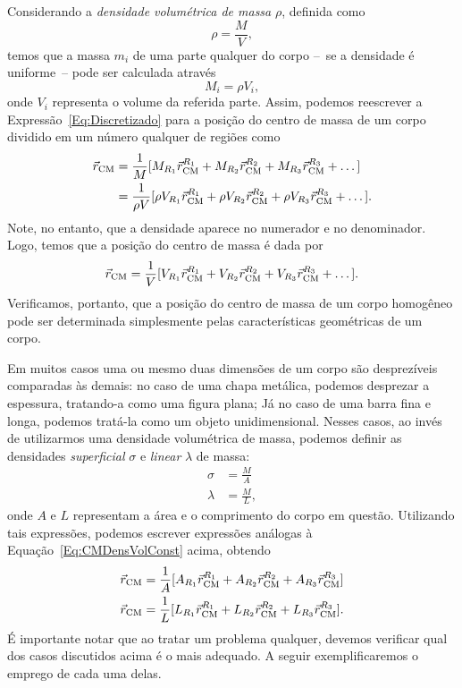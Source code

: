 Considerando a \emph{densidade volumétrica de massa} $\rho$, definida como
\begin{equation}
    \rho = \frac{M}{V},
\end{equation}
%
temos que a massa $m_i$ de uma parte qualquer do corpo --~se a densidade é uniforme~-- pode ser calculada através
\begin{equation}
    M_i = \rho V_i,
\end{equation}
%
onde $V_i$ representa o volume da referida parte. Assim, podemos reescrever a Expressão~\eqref{Eq:Discretizado} para a posição do centro de massa de um corpo dividido em um número qualquer de regiões como
\begin{align}
    \vec{r}_{\rm{CM}} &= \frac{1}{M} [M_{R_1} \vec{r}_{\rm{CM}}^{R_1} + M_{R_2} \vec{r}_{\rm{CM}}^{R_2} + M_{R_3} \vec{r}_{\rm{CM}}^{R_3} + \dots] \\
    &= \frac{1}{\rho V} [\rho V_{R_1} \vec{r}_{\rm{CM}}^{R_1} + \rho V_{R_2} \vec{r}_{\rm{CM}}^{R_2} + \rho V_{R_3} \vec{r}_{\rm{CM}}^{R_3} + \dots].
\end{align}
%
Note, no entanto, que a densidade aparece no numerador e no denominador. Logo, temos que a posição do centro de massa é dada por
\begin{equation}\label{Eq:CMDensVolConst}
    \vec{r}_{\rm{CM}} = \frac{1}{V} [V_{R_1} \vec{r}_{\rm{CM}}^{R_1} + V_{R_2} \vec{r}_{\rm{CM}}^{R_2} + V_{R_3} \vec{r}_{\rm{CM}}^{R_3} + \dots].
\end{equation}
%
Verificamos, portanto, que a posição do centro de massa de um corpo homogêneo pode ser determinada simplesmente pelas características geométricas de um corpo.

Em muitos casos uma ou mesmo duas dimensões de um corpo são desprezíveis comparadas às demais: no caso de uma chapa metálica, podemos desprezar a espessura, tratando-a como uma figura plana; Já no caso de uma barra fina e longa, podemos tratá-la como um objeto unidimensional. Nesses casos, ao invés de utilizarmos uma densidade volumétrica de massa, podemos definir as densidades \emph{superficial} $\sigma$ e \emph{linear} $\lambda$ de massa:
\begin{align}
    \sigma &= \frac{M}{A} \\
    \lambda &= \frac{M}{L},
\end{align}
%
onde $A$ e $L$ representam a área e o comprimento do corpo em questão. Utilizando tais expressões, podemos escrever expressões análogas à Equação~\ref{Eq:CMDensVolConst} acima, obtendo
\begin{align}
    \vec{r}_{\rm{CM}} &= \frac{1}{A} [A_{R_1} \vec{r}_{\rm{CM}}^{R_1} + A_{R_2} \vec{r}_{\rm{CM}}^{R_2} + A_{R_3} \vec{r}_{\rm{CM}}^{R_3}] \label{Eq:CMDensSupConst}\\
    \vec{r}_{\rm{CM}} &= \frac{1}{L} [L_{R_1} \vec{r}_{\rm{CM}}^{R_1} + L_{R_2} \vec{r}_{\rm{CM}}^{R_2} + L_{R_3} \vec{r}_{\rm{CM}}^{R_3}].\label{Eq:CMDensLinConst}
\end{align}
%
É importante notar que ao tratar um problema qualquer, devemos verificar qual dos casos discutidos acima é o mais adequado. A seguir exemplificaremos o emprego de cada uma delas.

